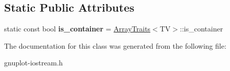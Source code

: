 \subsection*{Static Public Attributes}
\begin{DoxyCompactItemize}
\item 
\mbox{\label{classgnuplotio_1_1IteratorRange_a3f79d84bdf18761b6e49ae54d050f8ff}} 
static const bool {\bfseries is\+\_\+container} = \hyperlink{classgnuplotio_1_1ArrayTraits}{Array\+Traits}$<$TV$>$\+::is\+\_\+container
\end{DoxyCompactItemize}


The documentation for this class was generated from the following file\+:\begin{DoxyCompactItemize}
\item 
gnuplot-\/iostream.\+h\end{DoxyCompactItemize}
